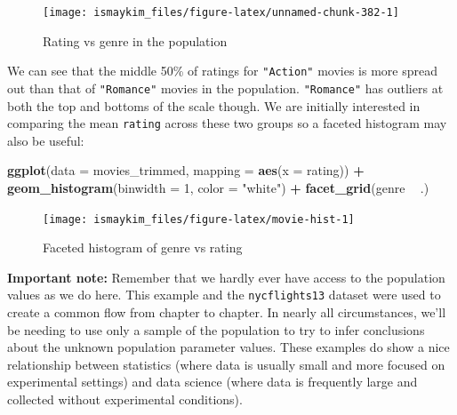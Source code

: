 \documentclass[12pt,]{krantz}
\makeatletter
\newenvironment{Shaded}{\begin{snugshade}}{\end{snugshade}}
\newcommand{\KeywordTok}[1]{\textcolor[rgb]{0.27,0.27,0.27}{\textbf{#1}}}
\newcommand{\DataTypeTok}[1]{\textcolor[rgb]{0.27,0.27,0.27}{#1}}
\newcommand{\DecValTok}[1]{\textcolor[rgb]{0.06,0.06,0.06}{#1}}
\newcommand{\StringTok}[1]{\textcolor[rgb]{0.5,0.5,0.5}{#1}}
\newcommand{\OperatorTok}[1]{\textcolor[rgb]{0.43,0.43,0.43}{\textbf{#1}}}
\newcommand{\NormalTok}[1]{#1}
\newenvironment{kframe}{%
\medskip{}
\setlength{\fboxsep}{.8em}
 \def\at@end@of@kframe{}%
 \ifinner\ifhmode%
  \def\at@end@of@kframe{\end{minipage}}%
  \begin{minipage}{\columnwidth}%
 \fi\fi%
 \def\FrameCommand##1{\hskip\@totalleftmargin \hskip-\fboxsep
 \colorbox{shadecolor}{##1}\hskip-\fboxsep
     \hskip-\linewidth \hskip-\@totalleftmargin \hskip\columnwidth}%
 \MakeFramed {\advance\hsize-\width
   \@totalleftmargin\z@ \linewidth\hsize
   \@setminipage}}%
 {\par\unskip\endMakeFramed%
 \at@end@of@kframe}
\renewenvironment{Shaded}{\begin{kframe}}{\end{kframe}}
\theoremstyle{definition}
\theoremstyle{definition}
\theoremstyle{definition}
\theoremstyle{remark}
\makeatother
\begin{document}
\begin{figure}

{\centering \texttt{[image: ismaykim\_files/figure-latex/unnamed-chunk-382-1]} 

}

\caption{Rating vs genre in the population}\label{fig:unnamed-chunk-382}
\end{figure}

We can see that the middle 50\% of ratings for \texttt{"Action"} movies
is more spread out than that of \texttt{"Romance"} movies in the
population. \texttt{"Romance"} has outliers at both the top and bottoms
of the scale though. We are initially interested in comparing the mean
\texttt{rating} across these two groups so a faceted histogram may also
be useful:

\begin{Shaded}
\begin{Highlighting}[]
\KeywordTok{ggplot}\NormalTok{(}\DataTypeTok{data =}\NormalTok{ movies_trimmed, }\DataTypeTok{mapping =} \KeywordTok{aes}\NormalTok{(}\DataTypeTok{x =}\NormalTok{ rating)) }\OperatorTok{+}
\StringTok{  }\KeywordTok{geom_histogram}\NormalTok{(}\DataTypeTok{binwidth =} \DecValTok{1}\NormalTok{, }\DataTypeTok{color =} \StringTok{"white"}\NormalTok{) }\OperatorTok{+}
\StringTok{  }\KeywordTok{facet_grid}\NormalTok{(genre }\OperatorTok{~}\StringTok{ }\NormalTok{.)}
\end{Highlighting}
\end{Shaded}

\begin{figure}

{\centering \texttt{[image: ismaykim\_files/figure-latex/movie-hist-1]} 

}

\caption{Faceted histogram of genre vs rating}\label{fig:movie-hist}
\end{figure}

\textbf{Important note:} Remember that we hardly ever have access to the
population values as we do here. This example and the
\texttt{nycflights13} dataset were used to create a common flow from
chapter to chapter. In nearly all circumstances, we'll be needing to use
only a sample of the population to try to infer conclusions about the
unknown population parameter values. These examples do show a nice
relationship between statistics (where data is usually small and more
focused on experimental settings) and data science (where data is
frequently large and collected without experimental conditions).
\end{document}
